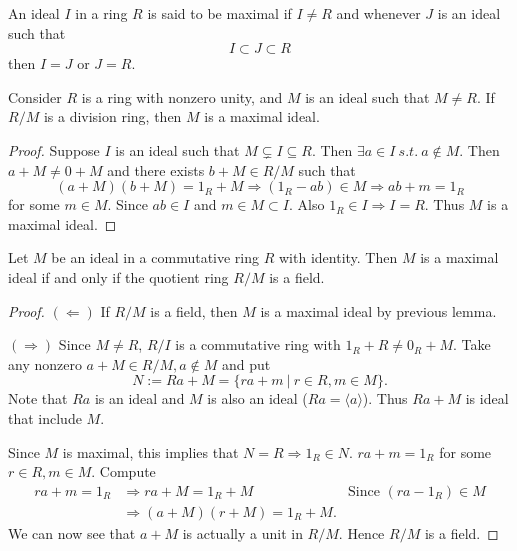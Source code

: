\begin{definition}
    An ideal $I$ in a ring $R$ is said to be maximal if $I \neq R$ and whenever $J$ is an ideal such that
    \[
        I \subset J \subset R
    \]
    then $I = J$ or $J = R$.
\end{definition}

\begin{lemma}
    Consider $R$ is a ring with nonzero unity, and $M$ is an ideal such that $M \neq R$. If $R/M$ is a 
    division ring, then $M$ is a maximal ideal.
\end{lemma}
\begin{proof}
    Suppose $I$ is an ideal such that $M \subsetneq I \subseteq R$. Then $\exists a \in I \> s.t. \> a \notin M$. 
    Then $a + M \neq 0 + M$ and there exists $b + M \in R/M$ such that 
    \[
        (a+M)(b+M) = 1_R + M \Longrightarrow (1_R - ab) \in M \Longrightarrow ab+m = 1_R
    \]
    for some $m \in M$. Since $ab \in I$ and $m \in M \subset I$. Also $1_R \in I \Longrightarrow I = R$. Thus $M$ is 
    a maximal ideal.
\end{proof}

\begin{theorem}
    Let $M$ be an ideal in a commutative ring $R$ with identity. Then $M$ is a maximal ideal if and only if
    the quotient ring $R/M$ is a field. 
\end{theorem}
\begin{proof}
    $(\Leftarrow)$ If $R/M$ is a field, then $M$ is a maximal ideal by previous lemma.

    $(\Rightarrow)$ Since $M \neq R$, $R/I$ is a commutative ring with 
    $1_R + R \neq 0_R + M$. Take any nonzero $a + M \in R/M, a \notin M$ and put 
    \[
        N := Ra + M = \{ ra+m \> | \> r \in R, m \in M \}.
    \]
    Note that $Ra$ is an ideal and $M$ is also an ideal ($Ra = \langle a \rangle$). 
    Thus $Ra + M$ is ideal that include $M$.

    Since $M$ is maximal, this implies that $N = R \Longrightarrow 1_R \in N$. 
    $ra + m = 1_R$ for some $r \in R, m \in M$. Compute 
    \begin{align*}
        ra + m = 1_R &\Rightarrow ra + M = 1_R + M & \text{Since } (ra-1_R) \in M\\
        &\Rightarrow (a+M)(r+M) = 1_R + M.
    \end{align*}
    We can now see that $a+M$ is actually a unit in $R/M$. Hence $R/M$ is a field.
\end{proof}

